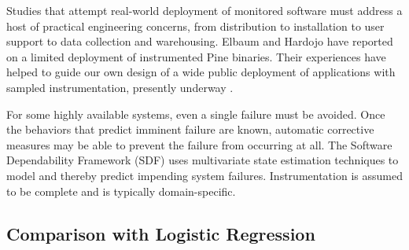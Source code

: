 \documentclass[draft]{sig-alternate}
\newcommand{\issue}[2][]{}
\begin{document}
Studies that attempt real-world deployment of monitored software must
address a host of practical engineering concerns, from distribution to
installation to user support to data collection and warehousing.
Elbaum and Hardojo \cite{Elbaum:2003:DISATA} have reported on a
limited deployment of instrumented Pine binaries.  Their experiences
have helped to guide our own design of a wide public deployment of
applications with sampled instrumentation, presently underway
\cite{Liblit:2004:PDCBI}.

For some highly available systems, even a single failure must be
avoided.  Once the behaviors that predict imminent failure are known,
automatic corrective measures may be able to prevent the failure from
occurring at all.  The Software Dependability Framework (SDF)
\cite{Gross:2003:PSMUST} uses multivariate state estimation
techniques to model and thereby predict impending system failures.
Instrumentation is assumed to be complete and is typically
domain-specific.

\issue[Alex]{There is a new Ernst paper in FSE and there was another
  one in ICSE\@.  I'm not sure either is really relevant, but if we are
  going to cite him we should show awareness of the more recent work.}

\issue[Alex]{I don't know what Orso has been doing other than that he
  told me they have done a study on whether code coverage in the field
  is similar to code coverage in testing; we should cite that one.
  It's on his home page, I'm pretty sure (Alessandro Orso, I think, at
  Georgia Tech).}

\issue[Mayur]{Add references to Ernst and Orso.  [I think we already
  have enough references to these folks and the related work section
  is already quite long.  Let us give this the least priority.]}

\subsection{Comparison with Logistic Regression}
\label{sec:comparison}
\end{document}
